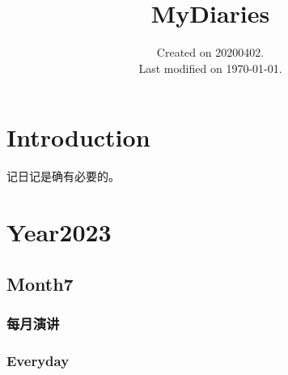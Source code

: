 \documentclass[UTF8]{Diaries}
\begin{document}
\title{MyDiaries}
\date{Created on 20200402.\\   Last modified on \today.}
\maketitle
\tableofcontents




\chapter{Introduction}

记日记是确有必要的。

\chapter{Year2023}


\section{Month7}
\subsection{每月演讲}


\subsection{Everyday}
\end{document}
